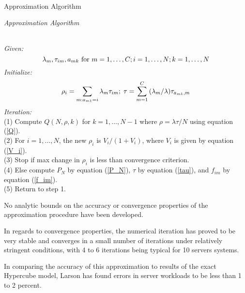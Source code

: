 \begin{frame}{Approximation Algorithm}{}
  {\footnotesize
    \begin{center}
      \textit{ Approximation Algorithm}
    \end{center}
    \vspace{-8pt}
    \hline \\
    \vspace{2pt}
    \textit{Given:}
    \begin{equation*}
      \lambda_m,\tau_{im},a_{mk}\mbox{  for } m = 1,\ldots,C;i=1,\ldots,N;k=1,\ldots,N \hfill
    \end{equation*}
    \textit{Initialize:}
    \begin{equation*}
      \rho_i = \sum_{m: a_{m1} = i}{\lambda_m \tau_{im}}; \; \tau = \sum_{m=1}^{C}{(\lambda_m/\lambda)\tau_{a_{m1},m}} \hfill
    \end{equation*}
    \textit{Iteration:}\\
    (1) Compute $Q(N,\rho,k)$ for $k = 1,\ldots,N-1$ where $\rho = \lambda \tau / N$ using equation (\ref{Q}). \\
    (2) For $i = 1,\ldots,N$, the new $\rho_i$ is $V_i/(1+V_i)$, where $V_i$ is given by equation (\ref{V_i}). \\
    (3) Stop if max change in $\rho_i$ is less than convergence criterion. \\
    (4) Else compute $P_N$ by equation (\ref{P_N}), $\tau$ by equation (\ref{tau}), and $f_{im}$ by equation (\ref{f_im}). \\
    (5) Return to step 1. \\
    \hline
  }
\end{frame}

\begin{frame}
  No analytic bounds on the accuracy or convergence properties of the approximation procedure have been developed.

  In regards to convergence properties,
  the numerical iteration has proved to be very stable and converges in a small number of iterations under relatively stringent conditions,
  with 4 to 6 iterations being typical for 10 servers systems.

  In comparing the accuracy of this approximation to results of the exact Hypercube model,
  Larson has found errors in server workloads to be less than 1 to 2 percent.
\end{frame}
